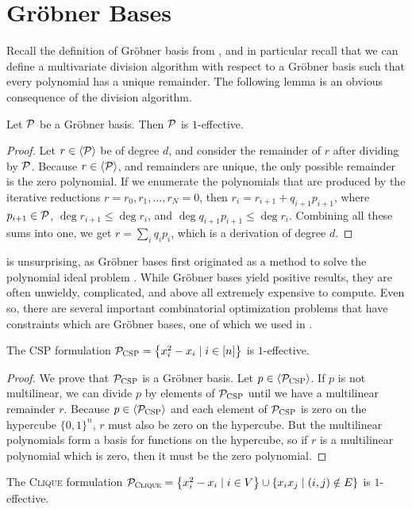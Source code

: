 \section{Gr\"obner Bases}
Recall the definition of Gr\"obner basis from , and in particular recall that we can define a multivariate division algorithm with respect to a Gr\"obner basis such that every polynomial has a unique remainder. The following lemma is an obvious consequence of the division algorithm.
\begin{lemma}\label{lem:grobnereffective}
Let $\mathcal P$ be a Gr\"obner basis. Then $\mathcal P$ is $1$-effective.
\end{lemma}
\begin{proof}
Let $r \in \langle \mathcal P \rangle$ be of degree $d$, and consider the remainder of $r$ after dividing by $\mathcal P$. Because $r \in \langle \mathcal P \rangle$, and remainders are unique, the only possible remainder is the zero polynomial. If we enumerate the polynomials that are produced by the iterative reductions $r = r_0, r_1, \dots, r_N = 0$, then 
$r_i = r_{i+1} + q_{i+1}p_{i+1}$, where $p_{i+1} \in \mathcal P$, $\deg r_{i+1} \leq \deg r_i$, and $\deg q_{i+1}p_{i+1} \leq \deg r_i$. Combining all these sums into one, we get
$r = \sum_i q_i p_i$, which is a derivation of degree $d$. 
\end{proof}
 is unsurprising, as Gr\"obner bases first originated as a method to solve the polynomial ideal problem \cite{Buch65}. 
While Gr\"obner bases yield positive results, they are often unwieldy, complicated, and above all extremely expensive to compute. 
Even so, there are several important combinatorial optimization problems that have constraints which are Gr\"obner bases, one of which we used in .
\begin{corollary}\label{cor:csp-effective}
The \textsc{CSP} formulation $\mathcal P_{\textsc{CSP}} = \left\{x_i^2 - x_i \mid i \in [n]\right\}$ is $1$-effective.
\end{corollary}
\begin{proof}
We prove that $\mathcal P_{\textsc{CSP}}$ is a Gr\"obner basis. 
Let $p \in \langle \mathcal P_{\textsc{CSP}} \rangle$. If $p$ is not multilinear, we can divide $p$ by elements of $\mathcal P_{\textsc{CSP}}$ until we have a multilinear remainder $r$. Because 
$p \in \langle \mathcal P_{\textsc{CSP}} \rangle$ and each element of $\mathcal P_{\textsc{CSP}}$ is zero on the hypercube $\{0, 1\}^n$, $r$ must also be zero on the hypercube. But the multilinear
polynomials form a basis for functions on the hypercube, so if $r$ is a multilinear polynomial which is zero, then it must be the zero polynomial. 
\end{proof}
\begin{corollary}
The \textsc{Clique} formulation $\mathcal P_{\textsc{Clique}} = \left\{x_i^2 - x_i \mid i \in V\right\} \cup \left\{x_ix_j \mid (i,j) \notin E\right\}$ is $1$-effective.
\end{corollary}
